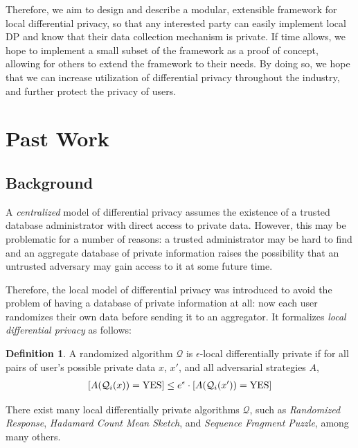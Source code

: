 \documentclass[12pt]{article}
\theoremstyle{definition}
\newtheorem{definition}{Definition}[section]
\let\Pr\relax
\DeclareMathOperator*{\Pr}{\mathbb{P}}
\begin{document}
\bigskip

Therefore, we aim to design and describe a modular, extensible framework for local differential privacy, so that any interested party can easily implement local DP and know that their data collection mechanism is private. If time allows, we hope to implement a small subset of the framework as a proof of concept, allowing for others to extend the framework to their needs. By doing so, we hope that we can increase utilization of differential privacy throughout the industry, and further protect the privacy of users.

\section{Past Work}

\subsection{Background}

\noindent

A \textit{centralized} model of differential privacy assumes the existence of a
trusted database administrator with direct access to private data. However,
this may be problematic for a number of reasons: a trusted administrator may be
hard to find and an aggregate database of private information raises the
possibility that an untrusted adversary may gain access to it at some future
time. \cite{dwork}

\bigskip

Therefore, the local model of differential privacy was introduced to avoid the
problem of having a database of private information at all: now each user
randomizes their own data before sending it to an aggregator. It formalizes
\textit{local differential privacy} as follows:

\begin{definition}
  A randomized algorithm $\mathcal{Q}$ is $\epsilon$-local differentially
  private if for all pairs of user's possible private data $x$, $x'$, and all
  adversarial strategies $A$, 
  \begin{align*} 
    \Pr[A(\mathcal{Q}_i(x)) = \mbox{YES}] \leq e^{\epsilon} \cdot \Pr[A(
    \mathcal{Q}_i(x')) = \mbox{YES}]
  \end{align*}
\end{definition}

There exist many local differentially private algorithms $\mathcal{Q}$, such as \textit{Randomized Response}, \textit{Hadamard Count Mean Sketch}, and \textit{Sequence Fragment Puzzle}, among many others.
\end{document}
